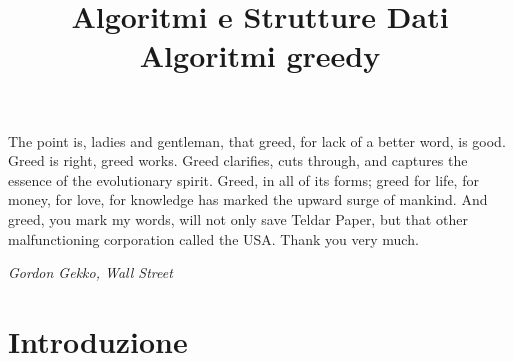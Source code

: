 
\title[ASD - Algoritmi greedy]{\textbf{Algoritmi e Strutture Dati}\\[24pt]Algoritmi greedy}

\usepackage{xcolor}
\usepackage{colortbl}
\usepackage{epigraph}
\usepackage{tikz}
\usetikzlibrary{trees}
\usetikzlibrary{matrix}
\usetikzlibrary{graphs}
\usetikzlibrary{shapes}
\usetikzlibrary{positioning}
\usepackage{xmpmulti}
\usepackage{listings}



\newcommand*\circled[1]{\tikz[baseline=(char.base)]{
            \node[circle,ball color=blue, shade, 
 color=white,inner sep=1.2pt] (char) {\tiny #1};}}

\newcommand{\R}[1]{\textcolor{red}{#1}}
\newcommand{\B}[1]{\textcolor{blue}{#1}}

\graphicspath{{figs/14/}}




\FrameTitle{}

\begin{PlainFrame}{}

\epigraph{The point is, ladies and gentleman, that greed, for lack of a better
word, is good. Greed is right, greed works. Greed clarifies, cuts through, and
captures the essence of the evolutionary spirit. Greed, in all of its forms;
greed for life, for money, for love, for knowledge has marked the upward surge of mankind. And greed, you mark my words, will not only save Teldar Paper, but
that other malfunctioning corporation called the USA. Thank you very
much.}{\textit{Gordon Gekko, Wall Street}}

\end{PlainFrame}

\FrameContent



\section{Introduzione}

